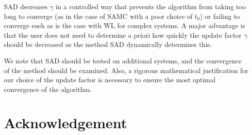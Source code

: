 \documentclass[letterpaper,twocolumn,amsmath,amssymb,pre,aps,10pt]{revtex4-1}
\begin{document}
SAD decreases $\gamma$ in a controlled way that prevents the algorithm
from taking too long to converge (as in the case of SAMC with a poor choice
of $t_0$) or failing to converge such as is the case with WL for complex
systems. A major advantage is that the user does not need to determine a
priori how quickly the update factor $\gamma$ should be decreased as the
method SAD dynamically determines this.

We note that SAD should be tested on additional systems, and the
convergence of the method should be examined.  Also, a rigorous
mathematical justification for our choice of the update factor is
necessary to ensure the most optimal convergence of the algorithm.

\section{Acknowledgement}


\end{document}
